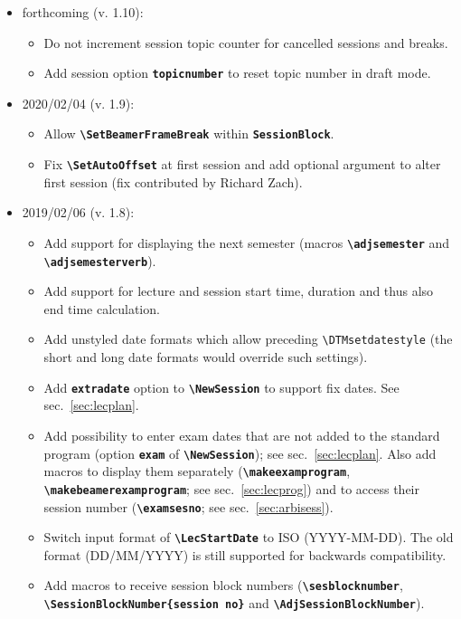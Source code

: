 \documentclass[english]{article}
\newcommand*\jmacro[1]{\textbf{\texttt{#1}}}
\newcommand*\jcsmacro[1]{\jmacro{\textbackslash{#1}}}
\newcommand*\joption[1]{\textbf{\texttt{#1}}}
\newcommand*\jfmacro[1]{\texttt{#1}}
\newcommand*\jfcsmacro[1]{\jfmacro{\textbackslash{#1}}}
\newcommand*\jparam[1]{\angus #1\angud}
\begin{document}
\begin{itemize}
\item forthcoming (v. 1.10):
	\begin{itemize}
		\item Do not increment session topic counter for cancelled sessions
and breaks.
		\item Add session option \joption{topicnumber} to reset topic number in draft mode.
	\end{itemize}
\item 2020/02/04 (v. 1.9):
	\begin{itemize}
		\item Allow \jcsmacro{SetBeamerFrameBreak} within \joption{SessionBlock}.
		\item Fix \jcsmacro{SetAutoOffset} at first session and add optional argument
		      to alter first session (fix contributed by Richard Zach).
	\end{itemize}
\item 2019/02/06 (v. 1.8):
	\begin{itemize}
		\item Add support for displaying the next semester (macros \jcsmacro{adjsemester} and
		      \jcsmacro{adjsemesterverb}).
		\item Add support for lecture and session start time, duration and thus also end time
		      calculation.
		\item Add unstyled date formats which allow preceding \jfcsmacro{DTMsetdatestyle}
		      (the short and long date formats would override such settings).
		\item Add \joption{extradate} option to \jcsmacro{NewSession} to support fix dates.
		      See sec.~\ref{sec:lecplan}.
		\item Add possibility to enter exam dates that are not added to the standard program
		      (option \joption{exam} of \jcsmacro{NewSession}); see sec.~\ref{sec:lecplan}.
		      Also add macros to display them separately (\jcsmacro{makeexamprogram},
		      \jcsmacro{makebeamerexamprogram}; see sec.~\ref{sec:lecprog}) and to
		      access their session number (\jcsmacro{examsesno}; see sec.~\ref{sec:arbisess}).
		\item Switch input format of \jcsmacro{LecStartDate} to ISO (YYYY-MM-DD). The old format
		      (DD/MM/YYYY) is still supported for backwards compatibility.
		\item Add macros to receive session block numbers (\jcsmacro{sesblocknumber},\\
		      \jcsmacro{SessionBlockNumber\{\jparam{session no}\}} and \jcsmacro{AdjSessionBlockNumber}).

\end{itemize}
\end{itemize}
\end{document}
